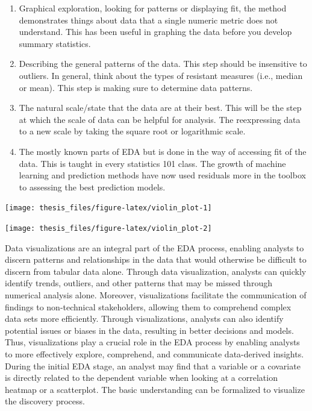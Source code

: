 \documentclass[print]{nuthesis}
\begin{document}
\begin{enumerate}
\def\labelenumi{\arabic{enumi}.}
\item
  Graphical exploration, looking for patterns or displaying fit, the method demonstrates things about data that a single numeric metric does not understand.
  This has been useful in graphing the data before you develop summary statistics.
\item
  Describing the general patterns of the data.
  This step should be insensitive to outliers.
  In general, think about the types of resistant measures (i.e., median or mean).
  This step is making sure to determine data patterns.
\item
  The natural scale/state that the data are at their best.
  This will be the step at which the scale of data can be helpful for analysis.
  The reexpressing data to a new scale by taking the square root or logarithmic scale.
\item
  The mostly known parts of EDA but is done in the way of accessing fit of the data.
  This is taught in every statistics 101 class.
  The growth of machine learning and prediction methods have now used residuals more in the toolbox to assessing the best prediction models.
\end{enumerate}

\begin{center}\texttt{[image: thesis\_files/figure-latex/violin\_plot-1]} \end{center}

\begin{center}\texttt{[image: thesis\_files/figure-latex/violin\_plot-2]} \end{center}

Data visualizations are an integral part of the EDA process, enabling analysts to discern patterns and relationships in the data that would otherwise be difficult to discern from tabular data alone.
Through data visualization, analysts can quickly identify trends, outliers, and other patterns that may be missed through numerical analysis alone.
Moreover, visualizations facilitate the communication of findings to non-technical stakeholders, allowing them to comprehend complex data sets more efficiently.
Through visualizations, analysts can also identify potential issues or biases in the data, resulting in better decisions and models.
Thus, visualizations play a crucial role in the EDA process by enabling analysts to more effectively explore, comprehend, and communicate data-derived insights.
During the initial EDA stage, an analyst may find that a variable or a covariate is directly related to the dependent variable when looking at a correlation heatmap or a scatterplot.
The basic understanding can be formalized to visualize the discovery process.
\end{document}
